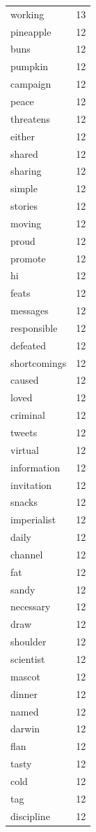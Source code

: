 \begin{tabular}{lr}
working & 13 \\
pineapple & 12 \\
buns & 12 \\
pumpkin & 12 \\
campaign & 12 \\
peace & 12 \\
threatens & 12 \\
either & 12 \\
shared & 12 \\
sharing & 12 \\
simple & 12 \\
stories & 12 \\
moving & 12 \\
proud & 12 \\
promote & 12 \\
hi & 12 \\
feats & 12 \\
messages & 12 \\
responsible & 12 \\
defeated & 12 \\
shortcomings & 12 \\
caused & 12 \\
loved & 12 \\
criminal & 12 \\
tweets & 12 \\
virtual & 12 \\
information & 12 \\
invitation & 12 \\
snacks & 12 \\
imperialist & 12 \\
daily & 12 \\
channel & 12 \\
fat & 12 \\
sandy & 12 \\
necessary & 12 \\
draw & 12 \\
shoulder & 12 \\
scientist & 12 \\
mascot & 12 \\
dinner & 12 \\
named & 12 \\
darwin & 12 \\
flan & 12 \\
tasty & 12 \\
cold & 12 \\
tag & 12 \\
discipline & 12 \\

\end{tabular}
